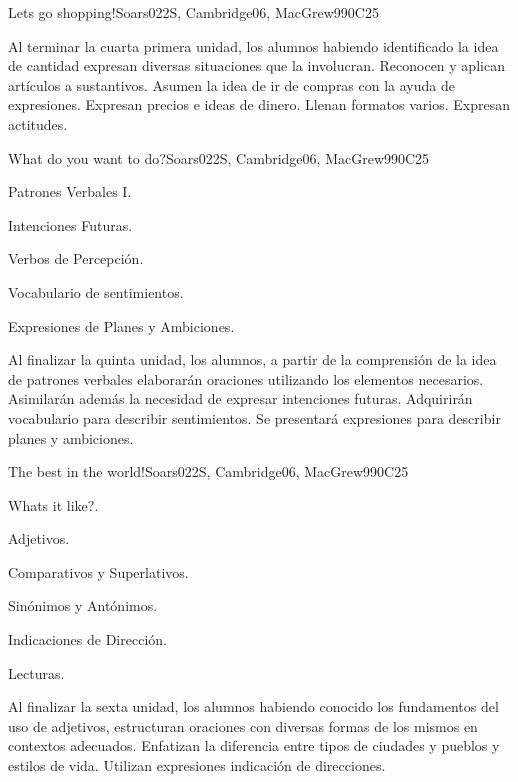 \begin{syllabus}
\begin{unit}{Lets go shopping!}{}{Soars022S, Cambridge06, MacGrew99}{0}{C25}
   \begin{learningoutcomes}
      \item Al terminar la cuarta primera unidad, los alumnos habiendo identificado la idea de cantidad expresan diversas situaciones que la involucran. Reconocen y aplican artí­culos a sustantivos. Asumen la idea de ir de compras con la ayuda de expresiones. Expresan precios e ideas de dinero. Llenan formatos varios. Expresan actitudes.
   \end{learningoutcomes}
\end{unit}

\begin{unit}{What do you want to do?}{}{Soars022S, Cambridge06, MacGrew99}{0}{C25}
   \begin{topics}
      \item Patrones Verbales I.
      \item Intenciones Futuras.
      \item Verbos de Percepción.
      \item Vocabulario de sentimientos.
      \item Expresiones de Planes y Ambiciones.
   \end{topics}

   \begin{learningoutcomes}
      \item Al finalizar la quinta unidad, los alumnos, a partir de la comprensión de la idea de patrones verbales elaborarán oraciones utilizando los elementos necesarios. Asimilarán además la necesidad de expresar intenciones futuras. Adquirirán vocabulario para describir sentimientos. Se presentará expresiones para describir planes y ambiciones.
   \end{learningoutcomes}
\end{unit}

\begin{unit}{The best in the world!}{}{Soars022S, Cambridge06, MacGrew99}{0}{C25}
   \begin{topics}
      \item Whats it like?.
      \item Adjetivos.
      \item Comparativos y Superlativos.
      \item Sinónimos y Antónimos. 
      \item Indicaciones de Dirección.
      \item Lecturas.
   \end{topics}

   \begin{learningoutcomes}
      \item Al finalizar la sexta unidad, los alumnos habiendo conocido los fundamentos del uso de adjetivos, estructuran oraciones con diversas formas de los mismos en contextos adecuados. Enfatizan la diferencia entre tipos de ciudades y pueblos y estilos de vida. Utilizan expresiones indicación de direcciones.
   \end{learningoutcomes}
\end{unit}


\end{syllabus}

